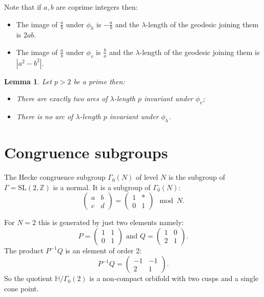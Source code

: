 \documentclass[12pt,a4paper]{amsart}
\newtheorem{lem}[thm]{Lemma}
\def\rh{\phi_h}
\def\rv{\phi_v}
\def\HH{\mathbb{H}}
\def\oo{\HH / \Gamma_0(2)}
\def\ZZ{\mathbb{Z}}
\begin{document}
Note that if $a,b$ are coprime integers then:
\begin{itemize}
	\item
The image of $\frac{a}{b}$ under $\rh$ is $-\frac{a}{b}$
and the $\lambda$-length of the geodesic joining them is $2ab$.

	\item
The image of $\frac{a}{b}$ under $\rv$ is $\frac{b}{a}$
and the $\lambda$-length of the geodesic joining them 
is $|a^2 - b^2|$.

\end{itemize}

\begin{lem}
	Let $p>2$ be a prime then:
	
\begin{itemize} 

	\item There are exactly two arcs of $\lambda$-length
		$p$ invariant under $\rv$;
	\item There is no arc of $\lambda$-length $p$
		invariant under $\rh$.

\end{itemize}
\end{lem}

\section{Congruence subgroups}

The Hecke congruence subgroup $\Gamma_0(N)$ of level $N$ is the subgroup of
$\Gamma = \mathrm{SL}(2,\ZZ)$ is a normal.
It is a subgroup of $\Gamma_0(N)$:
$$ \begin{pmatrix} a & b \\ c & d \end{pmatrix} = 
\begin{pmatrix} 1 & * \\ 0 & 1 \end{pmatrix} \mod N.$$

For $N=2$ this is generated by just two elements namely:
$$ P = \begin{pmatrix} 1 & 1 \\ 0 & 1 \end{pmatrix} \text{ and } Q=  \begin{pmatrix} 1 & 0 \\ 2 & 1 \end{pmatrix}.$$
The product $P^{-1}Q$ is an element of order $2$:
$$ P^{-1}Q = \begin{pmatrix} -1 & -1 \\ 2 & 1 \end{pmatrix}.$$
So the quotient $\oo$ is a non-compact orbifold with two cusps and a single cone point.
\end{document}
